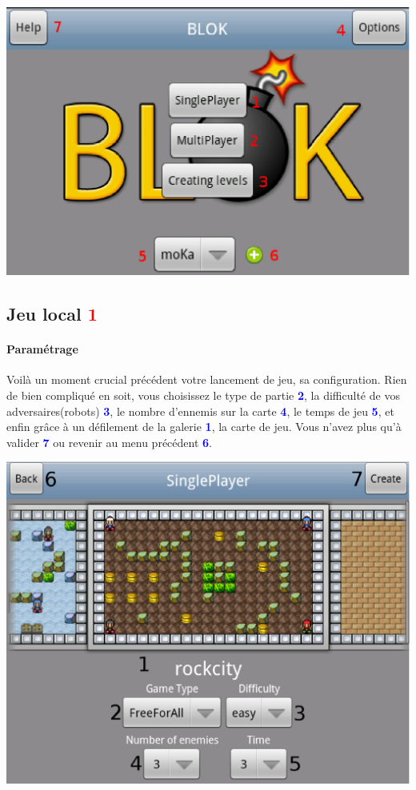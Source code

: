 	\begin{center}
			\includegraphics[scale=0.7]{Manuel/Img/3.eps}
	\end{center}
	
	
	
	\subsection{Jeu local \textcolor{red}{1}}
	\paragraph{Paramétrage\\}
	Voilà un moment crucial précédent votre lancement de jeu, sa configuration.
	Rien de bien compliqué en soit, vous choisissez le type de partie
	\textcolor{blue}{\textbf{2}}, la difficulté de vos adversaires(robots)
	\textcolor{blue}{\textbf{3}}, le nombre d'ennemis sur la carte
	\textcolor{blue}{\textbf{4}}, le temps de jeu \textcolor{blue}{\textbf{5}},
	et enfin grâce à un défilement de la galerie \textcolor{blue}{\textbf{1}}, la
	carte de jeu. Vous n'avez plus qu'à valider
	\textcolor{blue}{\textbf{7}} ou revenir au menu précédent
	\textcolor{blue}{\textbf{6}}.
	
	\begin{center}
		\includegraphics[scale=0.4]{Manuel/Img/15.eps}
	\end{center}
	
